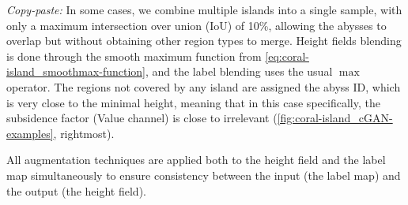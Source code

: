         \textit{Copy-paste:} In some cases, we combine multiple islands into a single sample, with only a maximum intersection over union (IoU) of 10\%, allowing the abysses to overlap but without obtaining other region types to merge. Height fields blending is done through the smooth maximum function from \cref{eq:coral-island_smoothmax-function}, and the label blending uses the usual $\max$ operator. The regions not covered by any island are assigned the abyss ID, which is very close to the minimal height, meaning that in this case specifically, the subsidence factor (Value channel) is close to irrelevant (\cref{fig:coral-island_cGAN-examples}, rightmost). 

All augmentation techniques are applied both to the height field and the label map simultaneously to ensure consistency between the input (the label map) and the output (the height field).